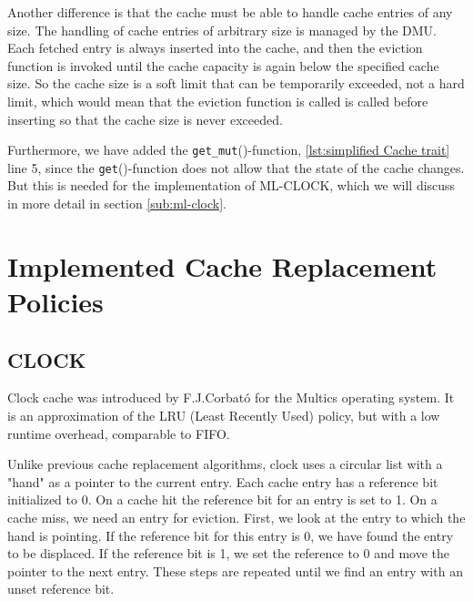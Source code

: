 \documentclass[
	12pt,
	a4paper,
	abstract,
	bibliography=totoc,
	chapterprefix,
	headings=openright,
	numbers=endperiod,
	parskip=half,
	twoside,
]{scrreprt}
\begin{document}
Another difference is that the cache must be able to handle cache entries of any size.
The handling of cache entries of arbitrary size is managed by the DMU.
Each fetched entry is always inserted into the cache, and then the eviction function is invoked until the cache capacity is again below the specified cache size.
So the cache size is a soft limit that can be temporarily exceeded, not a hard limit, which would mean that the eviction function is called
is called before inserting so that the cache size is never exceeded.

Furthermore, we have added the \texttt{get\_mut}()-function, \ref{lst:simplified Cache trait} line 5, 
since the \texttt{get}()-function does not allow that the state of the cache changes.
But this is needed for the implementation of ML-CLOCK, which we will discuss in more detail in section \ref{sub:ml-clock}.

\section{Implemented Cache Replacement Policies}
\label{sec:implemented cache replacement policies}
\subsection{CLOCK}

Clock cache was introduced by F.J.Corbató \cite{corbato1968paging} for the Multics operating system.
It is an approximation of the LRU (Least Recently Used) policy, but with a low runtime overhead, comparable to FIFO.

Unlike previous cache replacement algorithms, clock uses a circular list with a "hand" as a pointer to the current entry.
Each cache entry has a reference bit initialized to 0.
On a cache hit the reference bit for an entry is set to 1.
On a cache miss, we need an entry for eviction.
First, we look at the entry to which the hand is pointing. If the reference bit for this entry is 0, we have found the entry to be displaced.
If the reference bit is 1, we set the reference to 0 and move the pointer to the next entry.
These steps are repeated until we find an entry with an unset reference bit.
\end{document}
